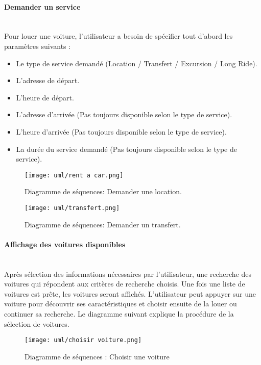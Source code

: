 \paragraph{Demander un service}\mbox{} \\
Pour louer une voiture, l'utilisateur a besoin de spécifier tout d'abord les paramètres suivants :
\begin{itemize}
    \item Le type de service demandé (Location / Transfert / Excursion / Long Ride).
    \item L'adresse de départ.
    \item L'heure de départ.
    \item L'adresse d'arrivée (Pas toujours disponible selon le type de service).
    \item L'heure d'arrivée (Pas toujours disponible selon le type de service).
    \item La durée du service demandé (Pas toujours disponible selon le type de service).
\end{itemize}
\vspace{1cm}
\begin{figure}[H]
    \centering
    \texttt{[image: uml/rent a car.png]}
    \vspace{1cm}
    \caption{Diagramme de séquences: Demander une location.}
    \label{fig:seq_location}
\end{figure}
\vspace{1cm}
\begin{figure}[H]
    \centering
    \texttt{[image: uml/transfert.png]}
    \vspace{1cm}
    \caption{Diagramme de séquences: Demander un transfert.}
    \label{fig:seq_transfert}
\end{figure}
\paragraph{Affichage des voitures disponibles} \mbox{}\\
Après sélection des informations nécessaires par l'utilisateur, une recherche des voitures qui répondent aux critères de recherche choisis. Une fois une liste de voitures est prête, les voitures seront affichés. L'utilisateur peut appuyer sur une voiture pour découvrir ses caractéristiques et choisir ensuite de la louer ou continuer sa recherche.
Le diagramme suivant explique la procédure de la sélection de voitures.
\vspace{1cm}
\begin{figure}
    \centering
    \texttt{[image: uml/choisir voiture.png]}
    \vspace{1cm}
    \caption{Diagramme de séquences : Choisir une voiture}
    \label{fig:seq_car_select}
\end{figure}
